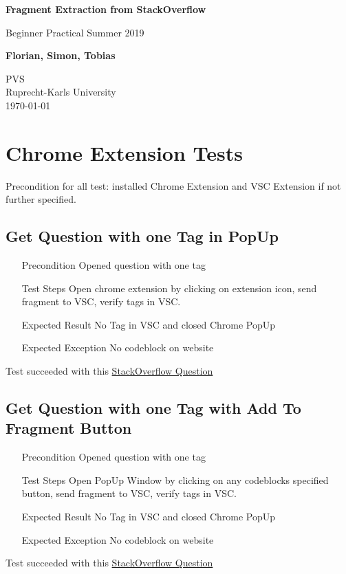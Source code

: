\documentclass{report}
\begin{document}
\begin{titlepage}
	\begin{center}
	\vspace*{1cm}
	\Huge

	\textbf{Fragment Extraction from StackOverflow}

	\vspace{0.5cm}
	\LARGE

	Beginner Practical Summer 2019

	\vspace{1.5cm}

	\textbf{Florian, Simon, Tobias}

	\vspace{1cm}
	
	\vfill


	\vspace{1.8cm}
	\Large
	PVS\\
	Ruprecht-Karls University\\
	\today
	\end{center}
    \end{titlepage}

\section*{Chrome Extension Tests}
Precondition for all test: installed Chrome Extension and VSC Extension if not further specified.
\subsection*{Get Question with one Tag in PopUp}
\begin{itemize}
	\item[Precondition] Opened question with one tag
	\item[Test Steps] Open chrome extension by clicking on extension icon, send fragment to VSC, verify tags in VSC.
	\item[Expected Result] No Tag in VSC and closed Chrome PopUp
	\item[Expected Exception] No codeblock on website
\end{itemize}
Test succeeded with this
\href{https://stackoverflow.com/questions/6393943/convert-javascript-string-in-dot-notation-into-an-object-reference}{StackOverflow Question}

\subsection*{Get Question with one Tag with Add To Fragment Button}
\begin{itemize}
	\item[Precondition] Opened question with one tag
	\item[Test Steps] Open PopUp Window by clicking on any codeblocks specified button, send fragment to VSC, verify tags in VSC.
	\item[Expected Result] No Tag in VSC and closed Chrome PopUp
	\item[Expected Exception] No codeblock on website
\end{itemize}
Test succeeded with this
\href{https://stackoverflow.com/questions/6393943/convert-javascript-string-in-dot-notation-into-an-object-reference}{StackOverflow Question}
\end{document}
